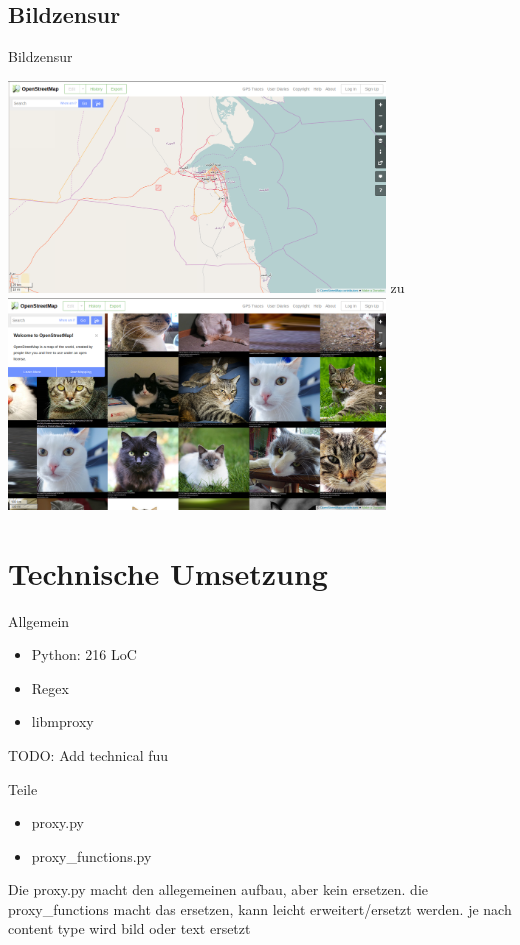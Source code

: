 \documentclass [xcolor=dvipsnames] {beamer}
\begin{document}
\subsection{Bildzensur}
\begin{frame}
	{\sc Bildzensur}
	\begin{center}
		{
			\includegraphics[width=10cm]{osm-1}
		}
		\only<2>
		{
			{\Large zu}
		}
		\only<3>
		{
			\includegraphics[width=10cm]{osm-mod-1}
		}
	\end{center}
\end{frame}

\section{Technische Umsetzung}
\begin{frame}
	{\sc Allgemein}
	\begin{itemize}
		\item Python: 216 LoC
		\item Regex
		\item libmproxy
	\end{itemize}
\end{frame}
\note
{
	{\Large TODO: Add technical fuu}
	
}
\begin{frame}
	{\sc Teile}
	\begin{itemize}
		\item proxy.py
		\item proxy_functions.py
	\end{itemize}
\end{frame}
\note
{
	{\Large Die proxy.py macht den allegemeinen aufbau, aber kein ersetzen. die proxy_functions macht das ersetzen, kann leicht erweitert/ersetzt werden. je nach content type wird bild oder text ersetzt}
	
}
\end{document}
